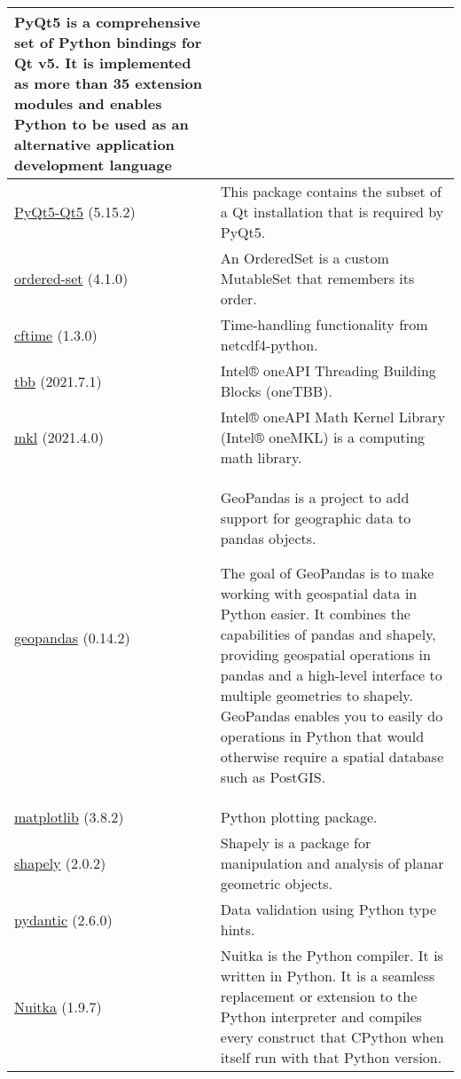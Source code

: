 \begin{longtable}{|p{4cm}|p{10cm}|}
PyQt5 is a comprehensive set of Python bindings for Qt v5. 
It is implemented as more than 35 extension modules and enables Python to be used as an alternative application development language \\ \hline
	\href{https://pypi.org/project/PyQt5-Qt/}{PyQt5-Qt5} (5.15.2)            & This package contains the subset of a Qt installation that is required by PyQt5. \\ \hline
	\href{https://pypi.org/project/ordered-set/}{ordered-set} (4.1.0)           & An OrderedSet is a custom MutableSet that remembers its order. \\ \hline
	\href{https://pypi.org/project/cftime/}{cftime} (1.3.0)                & Time-handling functionality from netcdf4-python. \\ \hline
	\href{https://pypi.org/project/tbb/}{tbb} (2021.7.1)                & Intel® oneAPI Threading Building Blocks (oneTBB). \\ \hline
	\href{https://pypi.org/project/mkl/}{mkl} (2021.4.0)                & Intel® oneAPI Math Kernel Library (Intel® oneMKL) is a computing math library. \\ \hline
	\href{https://pypi.org/project/geopandas/}{geopandas} (0.14.2)            & GeoPandas is a project to add support for geographic data to pandas objects.

The goal of GeoPandas is to make working with geospatial data in Python easier.
It combines the capabilities of pandas and shapely, providing geospatial operations in pandas and a high-level interface to multiple geometries to shapely.
GeoPandas enables you to easily do operations in Python that would otherwise require a spatial database such as PostGIS.                \\ \hline
	\href{https://pypi.org/project/matplotlib/}{matplotlib} (3.8.2)            & Python plotting package. \\ \hline
	\href{https://pypi.org/project/shapely/}{shapely} (2.0.2)               & Shapely is a package for manipulation and analysis of planar geometric objects. \\ \hline
	\href{https://pypi.org/project/pydantic/}{pydantic} (2.6.0)              & Data validation using Python type hints. \\ \hline \hline
	\href{https://pypi.org/project/Nuitka/}{Nuitka} (1.9.7)                & Nuitka is the Python compiler. It is written in Python.
It is a seamless replacement or extension to the Python interpreter and compiles every construct that CPython when itself run with that Python version.


\end{longtable}
